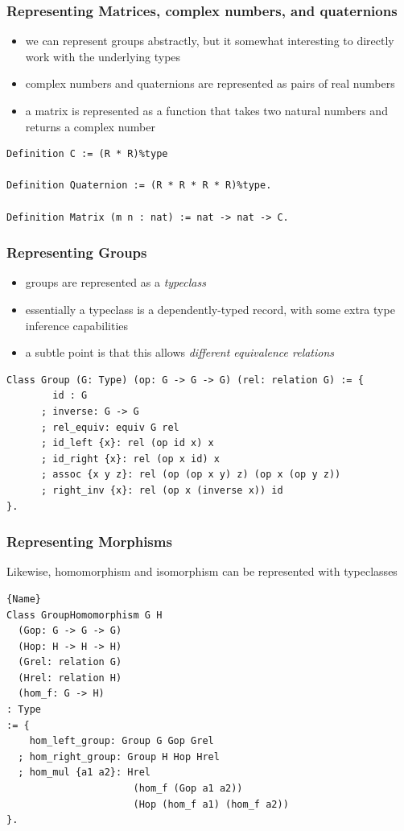 \documentclass{beamer}
\begin{document}
\begin{frame}[fragile]
\frametitle{Representing Matrices, complex numbers, and quaternions}

\begin{itemize}
	\item we can represent groups abstractly, but it somewhat interesting to directly work with the underlying types
	\item complex numbers and quaternions are represented as pairs of real numbers
	\item a matrix is represented as a function that takes two natural numbers and returns a complex number
\end{itemize}


\begin{lstlisting}[language=Coq]
Definition C := (R * R)%type

Definition Quaternion := (R * R * R * R)%type.

Definition Matrix (m n : nat) := nat -> nat -> C.
\end{lstlisting}
\end{frame}

\begin{frame}[fragile]
\frametitle{Representing Groups}
\begin{itemize}
	\item groups are represented as a \textit{typeclass}
	\item essentially a typeclass is a dependently-typed record, with some extra type inference capabilities
	\item a subtle point is that this allows \textit{different equivalence relations}
\end{itemize}

\begin{lstlisting}[language=Coq]
Class Group (G: Type) (op: G -> G -> G) (rel: relation G) := {
        id : G
      ; inverse: G -> G
      ; rel_equiv: equiv G rel
      ; id_left {x}: rel (op id x) x
      ; id_right {x}: rel (op x id) x
      ; assoc {x y z}: rel (op (op x y) z) (op x (op y z))
      ; right_inv {x}: rel (op x (inverse x)) id
}.
\end{lstlisting}
\end{frame}

\begin{frame}[fragile]
\frametitle{Representing Morphisms}

Likewise, homomorphism and isomorphism can be represented with typeclasses

\begin{lstlisting}[language=Coq]{Name}
Class GroupHomomorphism G H
  (Gop: G -> G -> G) 
  (Hop: H -> H -> H) 
  (Grel: relation G)
  (Hrel: relation H)
  (hom_f: G -> H)
: Type 
:= {
    hom_left_group: Group G Gop Grel
  ; hom_right_group: Group H Hop Hrel
  ; hom_mul {a1 a2}: Hrel
                      (hom_f (Gop a1 a2)) 
                      (Hop (hom_f a1) (hom_f a2))
}.
\end{lstlisting}

\end{frame}
\end{document}

